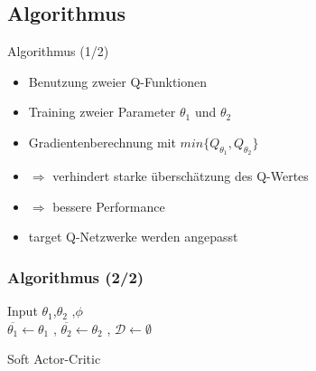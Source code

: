 \subsection{Algorithmus}
\begin{frame}{Algorithmus (1/2)}
\begin{itemize}
\item Benutzung zweier Q-Funktionen
\item Training zweier Parameter $\theta_{1}$ und $\theta_{2}$
\item Gradientenberechnung mit $min\{Q_{\theta_{1}},Q_{\theta_{2}}\}$
\item[] $\Rightarrow$ verhindert starke überschätzung des Q-Wertes
\item[] $\Rightarrow$ bessere Performance
\item target Q-Netzwerke werden angepasst
\end{itemize}
\end{frame}

\begin{frame}
    \frametitle{Algorithmus (2/2)}
    \begin{algorithm}[H]
        {\small
        \SetAlgoLined
        Input $\theta_{1}$,$\theta_{2}$ ,$\phi$\\
        $\overline{\theta_{1}} \leftarrow  \theta_{1}$ ,
        $\overline{\theta_{2}} \leftarrow \theta_{2}$ ,
        $\mathcal{D} \leftarrow \emptyset$\\
        }
         \caption{Soft Actor-Critic}
        \end{algorithm}
     
\end{frame}






